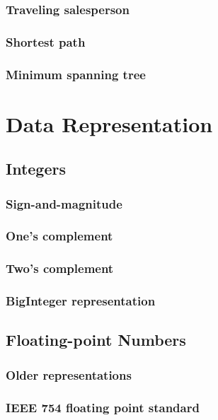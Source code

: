 \documentclass[11pt,twoside]{book}
\begin{document}
\section{Traveling salesperson}

\section{Shortest path}

\section{Minimum spanning tree}



\part{Data Representation}

\chapter{Integers}

\section{Sign-and-magnitude}

\section{One's complement}

\section{Two's complement}

\section{BigInteger representation}


\chapter{Floating-point Numbers}

\section{Older representations}

\section{IEEE 754 floating point standard}
\end{document}
